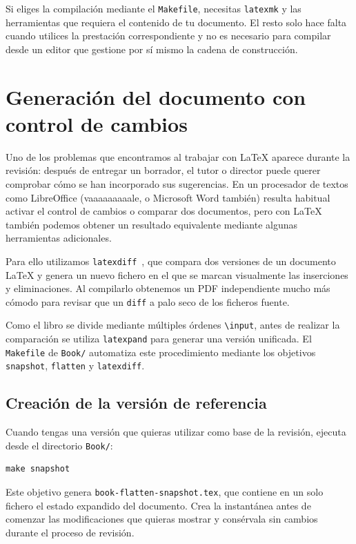 Si eliges la compilación mediante el \texttt{Makefile}, necesitas \texttt{latexmk} y las herramientas que requiera el contenido de tu documento. El resto solo hace falta cuando utilices la prestación correspondiente y no es necesario para compilar desde un editor que gestione por sí mismo la cadena de construcción.


\section{Generación del documento con control de cambios}
\label{sec:control-de-cambios}

Uno de los problemas que encontramos al trabajar con \LaTeX{} aparece durante la revisión: después de entregar un borrador, el tutor o director puede querer comprobar cómo se han incorporado sus sugerencias. En un procesador de textos como LibreOffice (vaaaaaaaaale, o Microsoft Word también) resulta habitual activar el control de cambios o comparar dos documentos, pero con \LaTeX{} también podemos obtener un resultado equivalente mediante algunas herramientas adicionales.

Para ello utilizamos \texttt{latexdiff}~\cite{latexdiff-manual}, que compara dos versiones de un documento \LaTeX{} y genera un nuevo fichero en el que se marcan visualmente las inserciones y eliminaciones. Al compilarlo obtenemos un PDF independiente mucho más cómodo para revisar que un \texttt{diff} a palo seco de los ficheros fuente.

Como el libro se divide mediante múltiples órdenes \texttt{\textbackslash{}input}, antes de realizar la comparación se utiliza \texttt{latexpand} para generar una versión unificada. El \texttt{Makefile} de \texttt{Book/} automatiza este procedimiento mediante los objetivos \texttt{snapshot}, \texttt{flatten} y \texttt{latexdiff}.

\subsection{Creación de la versión de referencia}

Cuando tengas una versión que quieras utilizar como base de la revisión, ejecuta desde el directorio \texttt{Book/}:

\begin{verbatim}
make snapshot
\end{verbatim}

Este objetivo genera \texttt{book-flatten-snapshot.tex}, que contiene en un solo fichero el estado expandido del documento. Crea la instantánea antes de comenzar las modificaciones que quieras mostrar y consérvala sin cambios durante el proceso de revisión.

